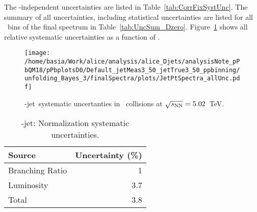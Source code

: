 The \pt-independent uncertainties are listed in Table~\ref{tab:CorrFixSystUnc}. 
The summary of all uncertainties, including statistical uncertainties are listed for all \ptchjet\ bins of the final spectrum in Table~\ref{tab:UncSum_Dzero}.
Figure~\ref{fig:SysUnce_Dzero} shows all relative systematic uncertainties as a function of \ptchjet.

\begin{figure}[bth]
\centering
\texttt{[image: /home/basia/Work/alice/analysis/alice\_Djets/analysisNote\_pPbQM18/pPbplotsD0/Default\_jetMeas3\_50\_jetTrue3\_50\_ppbinning/unfolding\_Bayes\_3/finalSpectra/plots/JetPtSpectra\_allUnc.pdf]}
\caption{\Dzero-jet\ systematic uncertanties in \pPb\ collisions at $\sqrt{s_{\rm NN}}=5.02$~TeV.}
\label{fig:SysUnce_Dzero}
\end{figure}


\begin{table}[bth]
\caption{\Dzero-jet: Normalization systematic uncertainties.}
     \label{tab:CorrFixSystUnc_Dzero}
\begin{center}
    \begin{tabular}{lr}
    \hline
Source & Uncertainty (\%) \\ \hline
Branching Ratio & 1 \\
Luminosity &  3.7\\
\hline
Total &  3.8\\
\hline
    \end{tabular}
    \end{center}
    \end{table}
    
